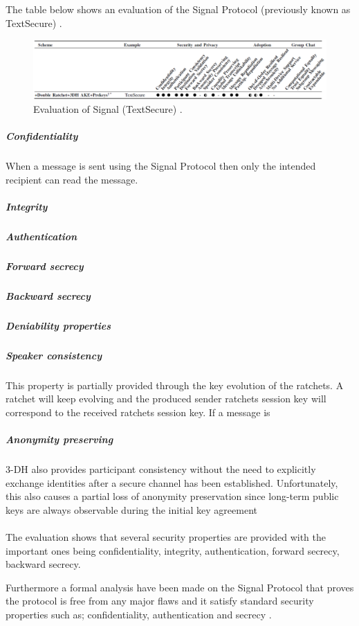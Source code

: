 The table below shows an evaluation of the Signal Protocol (previously known as TextSecure) \cite{sok}. 

\begin{figure}[H]
	\centering
	\includegraphics[width=12cm]{figures/framework_signal.png}
	\caption{Evaluation of Signal (TextSecure) \cite{sok}.}
	\label{fig:framework_signal}
\end{figure}




\subparagraph{Confidentiality} When a message is sent using the Signal Protocol then only the intended recipient can read the message.  

\subparagraph{Integrity}

\subparagraph{Authentication}

\subparagraph{Forward secrecy}

\subparagraph{Backward secrecy}

\subparagraph{Deniability properties}

\subparagraph{Speaker consistency}
This property is partially provided through the key evolution of the ratchets. A ratchet will keep evolving and the produced sender ratchets session key will correspond to the received ratchets session key. If a message is 


\subparagraph{Anonymity preserving}
3-DH also provides
participant consistency without the need to explicitly exchange
identities after a secure channel has been established. Unfortunately,
this also causes a partial loss of anonymity preservation
since long-term public keys are always observable during
the initial key agreement
\\
\\
The evaluation shows that several security properties are provided with the important ones being confidentiality, integrity, authentication, forward secrecy, backward secrecy. 

Furthermore a formal analysis have been made on the Signal Protocol that proves the protocol is free from any major flaws and it satisfy standard security properties such as; confidentiality, authentication and secrecy \cite{Signal}. 


